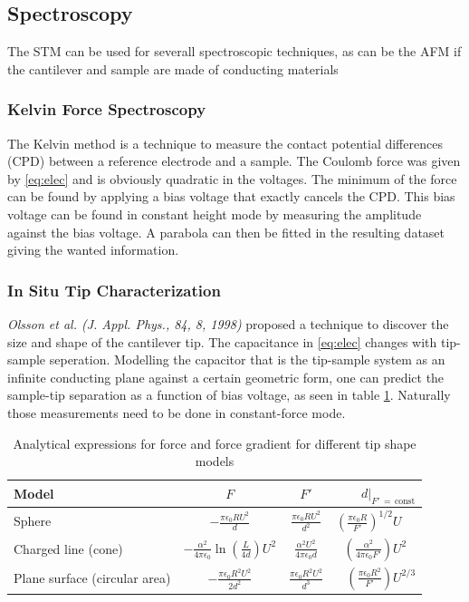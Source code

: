 \documentclass[a4paper,twoside,11pt]{scrartcl}
\begin{document}
\subsection{Spectroscopy}

The STM can be used for severall spectroscopic techniques, as can be the AFM if the cantilever and sample are made of conducting materials

\subsubsection{Kelvin Force Spectroscopy}

The Kelvin method is a technique to measure the contact potential differences (CPD) between a reference electrode and a sample. The Coulomb force was given by \eqref{eq:elec} and is obviously quadratic in the voltages. The minimum of the force can be found by applying a bias voltage that exactly cancels the CPD.
This bias voltage can be found in constant height mode by measuring the amplitude against the bias voltage. A parabola can then be fitted in the resulting dataset giving the wanted information.

\subsubsection{In Situ Tip Characterization}

\textit{Olsson et al. (J. Appl. Phys., 84, 8, 1998)} proposed a technique to discover the size and shape of the cantilever tip. The capacitance in \eqref{eq:elec} changes with tip-sample seperation. Modelling the capacitor that is the tip-sample system as an infinite conducting plane against a certain geometric form, one can predict the sample-tip separation as a function of bias voltage, as seen in table \ref{tab:tipshape}. Naturally those measurements need to be done in constant-force mode.

\begin{table}
\begin{center}
\begin{tabular}{lccr}
\toprule
Model & $F$ & $F'$ & $d|_{F'\,=\,\mbox{const}}$ \\
\midrule
Sphere & $-\frac{\pi \epsilon_0 R U^2}{d}$ & $\frac{\pi \epsilon_0 R U^2}{d^2}$ & $\left(\frac{\pi \epsilon_0 R}{F'}\right)^{1/2} U^{\phantom{1/2}}$ \\
Charged line (cone) & $-\frac{\alpha^2}{4 \pi \epsilon_0} \ln\left(\frac{L}{4d}\right) U^2$ & $\frac{\alpha^2 U^2}{4 \pi \epsilon_0 d}$ & $\left(\frac{\alpha^2}{4 \pi \epsilon_0 F'}\right) U^{2\phantom{/3}}$ \\
Plane surface (circular area) & $-\frac{\pi \epsilon_0 R^2 U^2}{2 d^2}$ & $\frac{\pi \epsilon_0 R^2 U^2}{d^3}$ & $\left(\frac{\pi \epsilon_0 R^2}{F'}\right) U^{2/3}$\\
\bottomrule
\end{tabular}
\end{center}
\par
\caption{Analytical expressions for force and force gradient for different tip shape models \label{tab:tipshape}}
\end{table}
\end{document}
